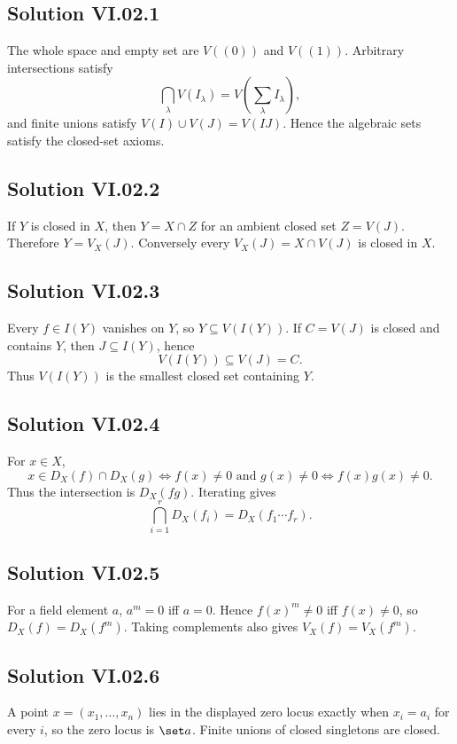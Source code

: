 
\subsection*{Solution VI.02.1}
The whole space and empty set are \(V((0))\) and \(V((1))\).  Arbitrary intersections satisfy
\[
\bigcap_\lambda V(I_\lambda)=V\!\left(\sum_\lambda I_\lambda\right),
\]
and finite unions satisfy \(V(I)\cup V(J)=V(IJ)\).  Hence the algebraic sets satisfy the
closed-set axioms.

\subsection*{Solution VI.02.2}
If \(Y\) is closed in \(X\), then \(Y=X\cap Z\) for an ambient closed set \(Z=V(J)\).
Therefore \(Y=V_X(J)\).  Conversely every \(V_X(J)=X\cap V(J)\) is closed in \(X\).

\subsection*{Solution VI.02.3}
Every \(f\in I(Y)\) vanishes on \(Y\), so \(Y\subseteq V(I(Y))\).  If \(C=V(J)\) is closed
and contains \(Y\), then \(J\subseteq I(Y)\), hence
\[
V(I(Y))\subseteq V(J)=C.
\]
Thus \(V(I(Y))\) is the smallest closed set containing \(Y\).

\subsection*{Solution VI.02.4}
For \(x\in X\),
\[
x\in D_X(f)\cap D_X(g)
\iff f(x)\neq0\text{ and }g(x)\neq0
\iff f(x)g(x)\neq0.
\]
Thus the intersection is \(D_X(fg)\).  Iterating gives
\[
\bigcap_{i=1}^rD_X(f_i)=D_X(f_1\cdots f_r).
\]

\subsection*{Solution VI.02.5}
For a field element \(a\), \(a^m=0\) iff \(a=0\).  Hence \(f(x)^m\neq0\) iff \(f(x)\neq0\),
so \(D_X(f)=D_X(f^m)\).  Taking complements also gives \(V_X(f)=V_X(f^m)\).

\subsection*{Solution VI.02.6}
A point \(x=(x_1,\dots,x_n)\) lies in the displayed zero locus exactly when
\(x_i=a_i\) for every \(i\), so the zero locus is \(\set a\).  Finite unions of closed
singletons are closed.


